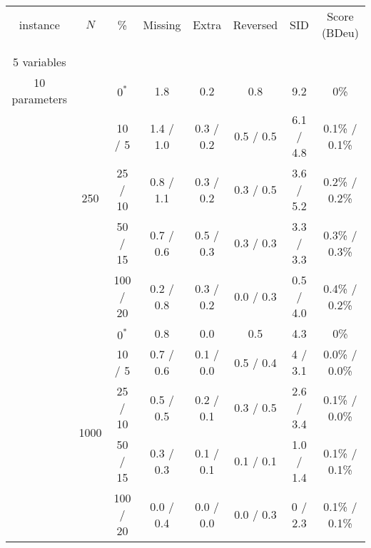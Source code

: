 \documentclass[twoside,11pt]{article}
\begin{document}
\begin{table}[H]
\scriptsize
\centering
\renewcommand\theadfont{}
\begin{tabular}{ c | c | c || c | c | c | c | c  }
instance & $N$ &  \% & Missing & Extra & Reversed & SID &  Score (BDeu) \\

\hhline{=|=|=||=|=|=|=|=}

\multirow{10}{*}{\thead{\textbf{cancer} \\ \\ 5 variables \\ 10 parameters}}  & \multirow{5}{*}{250}

& $0^*$ & 1.8 & 0.2 & 0.8 & 9.2 & 0\% \\
& & 10 / 5 & 1.4 / 1.0 & 0.3 / 0.2 & 0.5 / 0.5 & 6.1 / 4.8 & 0.1\% / 0.1\% \\
& & 25 / 10 & 0.8 / 1.1 & 0.3 / 0.2 & 0.3 / 0.5 & 3.6 / 5.2 & 0.2\% / 0.2\% \\
& & 50 / 15 & 0.7 / 0.6 & 0.5 / 0.3 & 0.3 / 0.3 & 3.3 / 3.3 & 0.3\% / 0.3\% \\
& & 100 / 20 & 0.2 / 0.8 & 0.3 / 0.2 & 0.0 / 0.3 & 0.5 / 4.0 & 0.4\% / 0.2\% \\


\hhline{~|-|-||-|-|-|-|-}

& \multirow{5}{*}{1000}

& $0^*$ & 0.8 & 0.0 & 0.5 & 4.3 & 0\% \\
& & 10 / 5 & 0.7 / 0.6 & 0.1 / 0.0 & 0.5 / 0.4 & 4 / 3.1 & 0.0\% / 0.0\% \\
& & 25 / 10 & 0.5 / 0.5 & 0.2 / 0.1 & 0.3 / 0.5 & 2.6 / 3.4 & 0.1\% / 0.0\% \\
& & 50 / 15 & 0.3 / 0.3 & 0.1 / 0.1 & 0.1 / 0.1 & 1.0 / 1.4 & 0.1\% / 0.1\% \\
& & 100 / 20 & 0.0 / 0.4 & 0.0 / 0.0 & 0.0 / 0.3 & 0 / 2.3 & 0.1\% / 0.1\% \\


\end{tabular}
\end{table}
\end{document}
